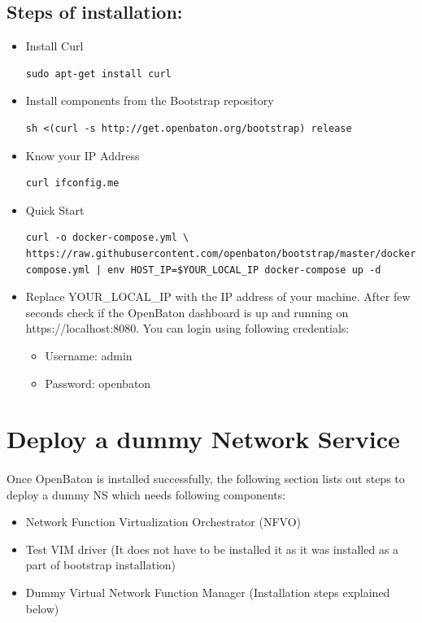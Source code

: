 		\subsection*{Steps of installation:}
		\begin{itemize}
			
			\item Install Curl
			\begin{lstlisting}
sudo apt-get install curl 
			\end{lstlisting}
			
			\item Install components from the Bootstrap repository
			\begin{lstlisting}
sh <(curl -s http://get.openbaton.org/bootstrap) release
			\end{lstlisting}
			
			\item Know your IP Address
			\begin{lstlisting}
curl ifconfig.me
			\end{lstlisting}
			
			\item Quick Start
			\begin{lstlisting}
curl -o docker-compose.yml \ https://raw.githubusercontent.com/openbaton/bootstrap/master/docker-compose.yml | env HOST_IP=$YOUR_LOCAL_IP docker-compose up -d
			\end{lstlisting}
			
			\item Replace YOUR\_LOCAL\_IP with the IP address of your machine. After few seconds check if the OpenBaton dashboard is up and running on https://localhost:8080.
			You can login using following credentials:
			\begin{itemize}
				\item Username: admin
				\item Password: openbaton
			\end{itemize}
		\end{itemize}
			
	\section{Deploy a dummy Network Service}
	\label{Deploy a dummy Network Service}
			\paragraph{}
			Once OpenBaton is installed successfully, the following section lists out steps to deploy a dummy NS which needs following components:
			\begin{itemize}
				\item Network Function Virtualization Orchestrator (NFVO)
				\item Test VIM driver (It does not have to be installed it as it was installed as a part of bootstrap installation)
				\item Dummy Virtual Network Function Manager (Installation steps explained below)
			\end{itemize}
		
